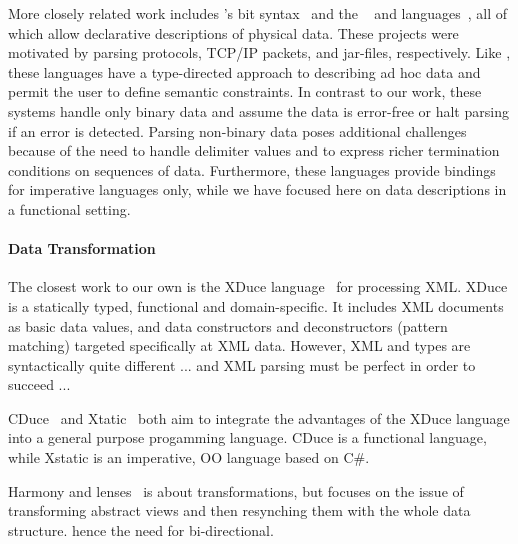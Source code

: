 More closely related work includes \erlang{}'s bit
syntax~\cite{erlang} and the \packettypes{}~\cite{sigcomm00} and
\datascript{} languages~\cite{gpce02}, all of which allow declarative
descriptions of physical data.  These projects were motivated by
parsing protocols, \textsc{TCP/IP} packets, and \java{} jar-files,
respectively.  Like \datatype{}, these languages have a type-directed
approach to describing ad hoc data and permit the user to define
semantic constraints.  In contrast to our work, these systems handle
only binary data and assume the data is error-free or halt parsing if
an error is detected.  Parsing non-binary data poses additional
challenges because of the need to handle delimiter values and to
express richer termination conditions on sequences of
data. Furthermore, these languages provide bindings for imperative
languages only, while we have focused here on data descriptions in a
functional setting.


\paragraph{Data Transformation}

The closest work to our own is the XDuce
language~\cite{hosoya+:xduce-journal} for processing {XML}. XDuce is a
statically typed, functional and domain-specific. It includes {XML}
documents as basic data values, and data constructors and
deconstructors (pattern matching) targeted specifically at {XML}
data. However, {XML} and \datatype{} types are syntactically quite
different ... and {XML} parsing must be perfect in order to succeed ...
 
CDuce~\cite{benzaken+:cduce} and Xtatic~\cite{gapeyev+:XtaticRuntime}
both aim to integrate the advantages of the XDuce language into a
general purpose progamming language. CDuce is a functional language,
while Xstatic is an imperative, OO language based on {C\#}.

Harmony and lenses~\cite{foster+:lenses} is about transformations, but
focuses on the issue of transforming abstract views and then
resynching them with the whole data structure. hence the need for
bi-directional.




